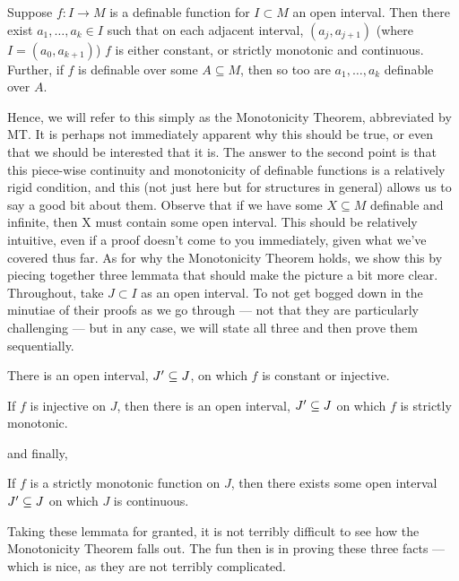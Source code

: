 \begin{theorem}
	\label{thm:monotonicity}
  Suppose $f \colon I \to M$ is a definable function for $I \subset M$ an open interval. Then there exist $a_1, \hdots, a_k \in I$ such that on each adjacent interval, $(a_j, a_{j+1})$ (where $I = (a_0, a_{k+1})$) $f$ is either constant, or strictly monotonic and continuous. Further, if $f$ is definable over some $A \subseteq M$, then so too are $a_1, \hdots, a_{k}$ definable over $A$.
\end{theorem}

Hence, we will refer to this simply as the Monotonicity Theorem, abbreviated by MT. It is perhaps not immediately apparent why this should be true, or even that we should be interested that it is. The answer to the second point is that this piece-wise continuity and monotonicity of definable functions is a relatively rigid condition, and this (not just here but for structures in general) allows us to say a good bit about them. Observe that if we have some $X \subseteq M$ definable and infinite, then X must contain some open interval. This should be relatively intuitive, even if a proof doesn't come to you immediately, given what we've covered thus far. As for why the Monotonicity Theorem holds, we show this by piecing together three lemmata that should make the picture a bit more clear. Throughout, take $J \subset I$ as an open interval. To not get bogged down in the minutiae of their proofs as we go through — not that they are particularly challenging — but in any case, we will state all three and then prove them sequentially.

\begin{lemma}
\label{lemma:monotonic-1}
  There is an open interval, $J^{\prime} \subseteq J$, on which $f$ is constant or injective.
\end{lemma}

\begin{lemma}
\label{lemma:monotonic-2}
  If $f$ is injective on $J$, then there is an open interval, $J^{\prime} \subseteq J$ on which $f$ is strictly monotonic.
\end{lemma}

and finally,

\begin{lemma}
\label{lemma:monotonic-3}
  If $f$ is a strictly monotonic function on $J$, then there exists some open interval $ J^{\prime} \subseteq J$ on which $J$ is continuous.
\end{lemma}

Taking these lemmata for granted, it is not terribly difficult to see how the Monotonicity Theorem falls out. The fun then is in proving these three facts — which is nice, as they are not terribly complicated.

